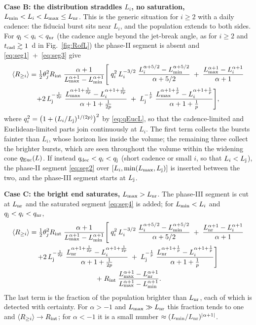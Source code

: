 \documentclass[11pt,a4paper]{article}
\newcommand{\Euc}{{\rm Euc}}
\newcommand{\dec}{{\rm dec}}
\newcommand{\nr}{{\rm nr}}
\newcommand{\Rint}{R_{\rm int}}
\newcommand{\tcad}{t_{\rm cad}}
\newcommand{\Ravg}{\langle R_{\geq i}\rangle}
\newcommand{\Lmin}{L_{\rm min}}
\newcommand{\Lmax}{L_{\rm max}}
\newcommand{\Lj}{L_{\rm j}}
\newcommand{\Lnr}{L_{\rm nr}}
\begin{document}
\medskip\noindent\textbf{Case B: the distribution straddles $L_i$, no saturation,} $\Lmin<L_i<\Lmax\le\Lnr$. This is the generic situation for $i\geq2$ with a daily cadence: the fiducial burst sits near $L_i$, and the population extends to both sides. For $q_{\rm j}<q_i<q_\nr$ (the cadence angle beyond the jet-break angle, as for $i\geq2$ and $\tcad\gtrsim1$~d in Fig.~\ref{fig:RofL}) the phase-II segment is absent and \eqref{eq:seg1}~+~\eqref{eq:seg3} give
\begin{multline}
\label{eq:caseB}
\Ravg=\tfrac12\theta_j^2\Rint\;\frac{\alpha+1}{\Lmax^{\alpha+1}-\Lmin^{\alpha+1}}\Biggl[\;q_i^2\,L_i^{-3/2}\;\frac{L_i^{\alpha+5/2}-\Lmin^{\alpha+5/2}}{\alpha+5/2}
\;+\;\frac{\Lmax^{\alpha+1}-L_i^{\alpha+1}}{\alpha+1}\\
+2\,\Lj^{-\frac{1}{2p}}\;\frac{\Lmax^{\alpha+1+\frac{1}{2p}}-L_i^{\alpha+1+\frac{1}{2p}}}{\alpha+1+\frac{1}{2p}}
\;+\;\Lj^{-\frac{1}{p}}\;\frac{\Lmax^{\alpha+1+\frac{1}{p}}-L_i^{\alpha+1+\frac{1}{p}}}{\alpha+1+\frac{1}{p}}\Biggr],
\end{multline}
where $q_i^2=\bigl(1+(L_i/\Lj)^{1/(2p)}\bigr)^2$ by \eqref{eq:qEucL}, so that the cadence-limited and Euclidean-limited parts join continuously at $L_i$. The first term collects the bursts fainter than $L_i$, whose horizon lies inside the volume; the remaining three collect the brighter bursts, which are seen throughout the volume within the widening cone $q_\Euc(L)$. If instead $q_\dec<q_i<q_{\rm j}$ (short cadence or small $i$, so that $L_i<\Lj$), the phase-II segment \eqref{eq:seg2} over $[L_i,\min(\Lmax,\Lj)]$ is inserted between the two, and the phase-III segment starts at $\Lj$.

\medskip\noindent\textbf{Case C: the bright end saturates,} $\Lmax>\Lnr$. The phase-III segment is cut at $\Lnr$ and the saturated segment \eqref{eq:seg4} is added; for $\Lmin<L_i$ and $q_{\rm j}<q_i<q_\nr$,
\begin{multline}
\label{eq:caseC}
\Ravg=\tfrac12\theta_j^2\Rint\;\frac{\alpha+1}{\Lmax^{\alpha+1}-\Lmin^{\alpha+1}}\Biggl[\;q_i^2\,L_i^{-3/2}\;\frac{L_i^{\alpha+5/2}-\Lmin^{\alpha+5/2}}{\alpha+5/2}
\;+\;\frac{\Lnr^{\alpha+1}-L_i^{\alpha+1}}{\alpha+1}\\
+2\,\Lj^{-\frac{1}{2p}}\;\frac{\Lnr^{\alpha+1+\frac{1}{2p}}-L_i^{\alpha+1+\frac{1}{2p}}}{\alpha+1+\frac{1}{2p}}
\;+\;\Lj^{-\frac{1}{p}}\;\frac{\Lnr^{\alpha+1+\frac{1}{p}}-L_i^{\alpha+1+\frac{1}{p}}}{\alpha+1+\frac{1}{p}}\Biggr]\\
\;+\;\Rint\;\frac{\Lmax^{\alpha+1}-\Lnr^{\alpha+1}}{\Lmax^{\alpha+1}-\Lmin^{\alpha+1}} .
\end{multline}
The last term is the fraction of the population brighter than $\Lnr$, each of which is detected with certainty. For $\alpha>-1$ and $\Lmax\gg\Lnr$ this fraction tends to one and $\Ravg\to\Rint$; for $\alpha<-1$ it is a small number $\approx(\Lmin/\Lnr)^{|\alpha+1|}$.
\end{document}
